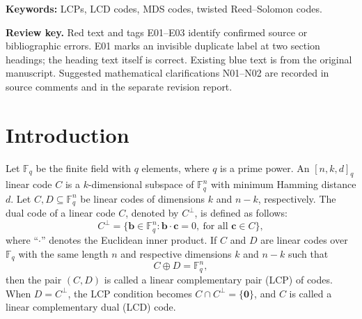 \documentclass[12pt,draftcls,journal,onecolumn]{IEEEtran}
\newcommand{\F}{{\mathbb{F}}}
\begin{document}
\textbf{Keywords:} LCPs, LCD codes, MDS codes, twisted Reed--Solomon codes.



%
\IEEEpeerreviewmaketitle

\begingroup\small
\noindent\textbf{Review key.} Red text and tags E01--E03 identify confirmed
source or bibliographic errors. E01 marks an invisible duplicate label at two
section headings; the heading text itself is correct. Existing blue text is
from the original manuscript. Suggested mathematical clarifications N01--N02
are recorded in source comments and in the separate revision report.
\par\endgroup\medskip


\section{Introduction}\label{sec-introduction}


\renewcommand{\thetheorem}{\arabic{section}.\arabic{theorem}}
\setcounter{theorem}{0}

Let $\F_q$ be the finite field with $q$ elements, where $q$ is a prime power. An $[n,k,d]_q$ linear code $C$ is a $k$-dimensional subspace of $\F_q^n$ with minimum Hamming distance $d$.
Let \(C,D\subseteq\F_q^n\) be linear codes of dimensions \(k\) and
\(n-k\), respectively. The dual code of a linear code \(C\), denoted by
\(C^\perp\), is defined as follows:
\[
C^\perp=\{\mathbf b\in\F_q^n:\mathbf b\cdot\mathbf c=0,\
\text{for all }\mathbf c\in C\},
\]
where ``\(\cdot\)'' denotes the Euclidean inner product. If \(C\) and
\(D\) are linear codes over \(\F_q\) with the same length \(n\) and
respective dimensions \(k\) and \(n-k\) such that
\[
C\oplus D=\F_q^n,
\]
then the pair \((C,D)\) is called a linear complementary pair (LCP) of
codes.
When $D=C^\perp$, the LCP condition becomes $C\cap C^\perp=\{\mathbf{0}\}$, and $C$ is called a linear complementary dual (LCD) code.
\end{document}
